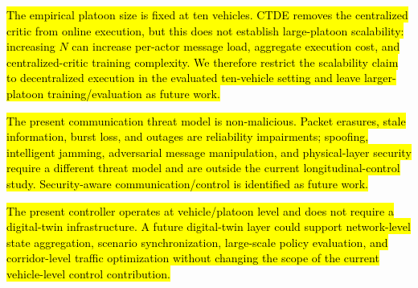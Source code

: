 \documentclass{ieeeaccess}
\begin{document}
\hl{The empirical platoon size is fixed at ten vehicles. CTDE removes the centralized critic from online execution, but this does not establish large-platoon scalability: increasing $N$ can increase per-actor message load, aggregate execution cost, and centralized-critic training complexity. We therefore restrict the scalability claim to decentralized execution in the evaluated ten-vehicle setting and leave larger-platoon training/evaluation as future work.}

\hl{The present communication threat model is non-malicious. Packet erasures, stale information, burst loss, and outages are reliability impairments; spoofing, intelligent jamming, adversarial message manipulation, and physical-layer security require a different threat model and are outside the current longitudinal-control study. Security-aware communication/control is identified as future work.}

\hl{The present controller operates at vehicle/platoon level and does not require a digital-twin infrastructure. A future digital-twin layer could support network-level state aggregation, scenario synchronization, large-scale policy evaluation, and corridor-level traffic optimization without changing the scope of the current vehicle-level control contribution.}
\end{document}
